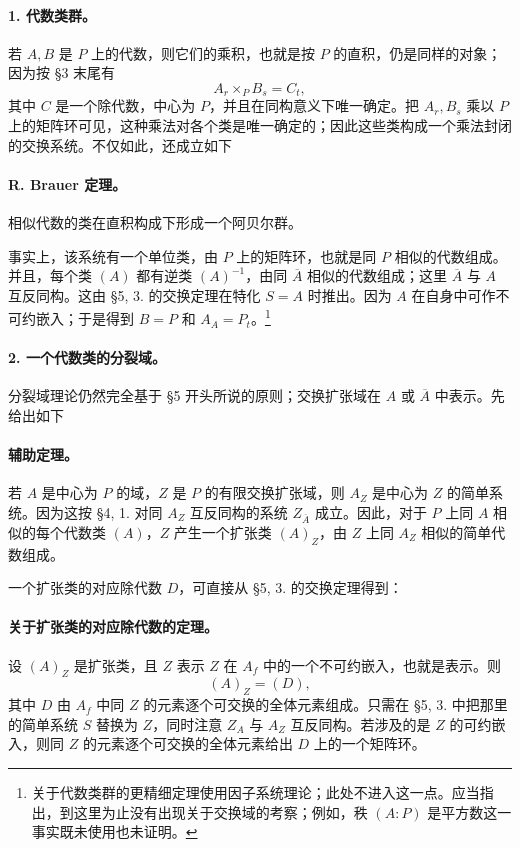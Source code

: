 \paragraph{1. 代数类群。}
若 \(A,B\) 是 \(P\) 上的代数，则它们的乘积，也就是按 \(P\) 的直积，仍是同样的对象；因为按 §3 末尾有
\[
        A_r\times_P B_s=C_t,
\]
其中 \(C\) 是一个除代数，中心为 \(P\)，并且在同构意义下唯一确定。把 \(A_r,B_s\) 乘以 \(P\) 上的矩阵环可见，这种乘法对各个类是唯一确定的；因此这些类构成一个乘法封闭的交换系统。不仅如此，还成立如下

\paragraph{R. Brauer 定理。}
相似代数的类在直积构成下形成一个阿贝尔群。

事实上，该系统有一个单位类，由 \(P\) 上的矩阵环，也就是同 \(P\) 相似的代数组成。并且，每个类 \((A)\) 都有逆类 \((A)^{-1}\)，由同 \(\overline A\) 相似的代数组成；这里 \(\overline A\) 与 \(A\) 互反同构。这由 §5, 3. 的交换定理在特化 \(S=A\) 时推出。因为 \(A\) 在自身中可作不可约嵌入；于是得到 \(B=P\) 和 \(A_A=P_t\)。\footnote{关于代数类群的更精细定理使用因子系统理论；此处不进入这一点。应当指出，到这里为止没有出现关于交换域的考察；例如，秩 \((A:P)\) 是平方数这一事实既未使用也未证明。}

\paragraph{2. 一个代数类的分裂域。}
分裂域理论仍然完全基于 §5 开头所说的原则；交换扩张域在 \(A\) 或 \(\overline A\) 中表示。先给出如下

\paragraph{辅助定理。}
若 \(A\) 是中心为 \(P\) 的域，\(Z\) 是 \(P\) 的有限交换扩张域，则 \(A_Z\) 是中心为 \(Z\) 的简单系统。因为这按 §4, 1. 对同 \(A_Z\) 互反同构的系统 \(Z_{\overline A}\) 成立。因此，对于 \(P\) 上同 \(A\) 相似的每个代数类 \((A)\)，\(Z\) 产生一个扩张类 \((A)_Z\)，由 \(Z\) 上同 \(A_Z\) 相似的简单代数组成。

一个扩张类的对应除代数 \(D\)，可直接从 §5, 3. 的交换定理得到：

\paragraph{关于扩张类的对应除代数的定理。}
设 \((A)_Z\) 是扩张类，且 \(Z\) 表示 \(Z\) 在 \(A_f\) 中的一个不可约嵌入，也就是表示。则
\[
        (A)_Z=(D),
\]
其中 \(D\) 由 \(A_f\) 中同 \(Z\) 的元素逐个可交换的全体元素组成。只需在 §5, 3. 中把那里的简单系统 \(S\) 替换为 \(Z\)，同时注意 \(Z_A\) 与 \(A_Z\) 互反同构。若涉及的是 \(Z\) 的可约嵌入，则同 \(Z\) 的元素逐个可交换的全体元素给出 \(D\) 上的一个矩阵环。

